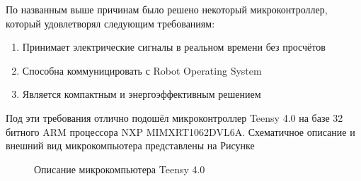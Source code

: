 \documentclass[12pt,a4paper]{scrartcl}
\begin{document}
			По названным выше причинам было решено некоторый микроконтроллер, который удовлетворял следующим требованиям:
			\begin{enumerate}
				\item Принимает электрические сигналы в реальном времени без просчётов
				\item Способна коммуницировать с Robot Operating System
				\item Является компактным и энергоэффективным решением
			\end{enumerate}
			
			Под эти требования отлично подошёл микроконтроллер Teensy 4.0 на базе 32 битного ARM процессора NXP MIMXRT1062DVL6A. Схематичное описание и внешний вид микрокомпьютера представлены на Рисунке 
			
			\begin{figure}[h]
				\caption{Описание микрокомпьютера Teensy 4.0}
				\label{fig:TeensyDesc}
			\end{figure}
			
\end{document}

